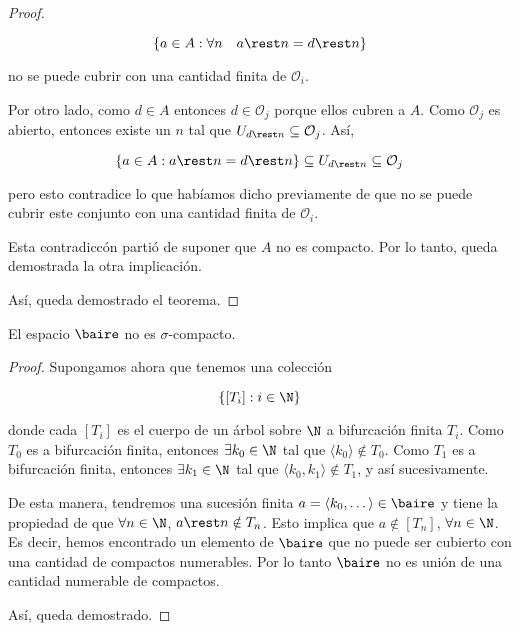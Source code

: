 \begin{proof}
\begin{itemize}
        \[
        \{ a \in A : \forall n \quad a \rest n = d \rest n \}
        \]
        
        \noindent no se puede cubrir con una cantidad finita de $\mathcal{O}_i$.
        
        Por otro lado, como $d \in A$ entonces $d \in \mathcal{O}_j$ porque ellos cubren a $A$. Como $\mathcal{O}_j$ es abierto, entonces existe un $n$ tal que $U_{d \rest n} \subseteq \mathcal{O}_j$. Así,
        
        \[
        \{a \in A : a \rest n = d \rest n\} \subseteq U_{d \rest n} \subseteq \mathcal{O}_j
        \]
        
        \noindent pero esto contradice lo que habíamos dicho previamente de que no se puede cubrir este conjunto con una cantidad finita de $\mathcal{O}_i$.
        
        Esta contradiccón partió de suponer que $A$ no es compacto. Por lo tanto, queda demostrada la otra implicación.
    \end{itemize}
    
    Así, queda demostrado el teorema.
\end{proof}

\begin{teo}
    El espacio $\baire$ no es $\sigma$-compacto.
\end{teo}

\begin{proof}
    Supongamos ahora que tenemos una colección

    \[
    \left\{ [T_i] : i \in \N \right\}
    \]
    
    \noindent donde cada $[T_i]$ es el cuerpo de un árbol sobre $\N$ a bifurcación finita $T_i$. Como $T_0$ es a bifurcación finita, entonces $\exists k_0 \in \N$ tal que $\langle k_0 \rangle \notin T_0$. Como $T_1$ es a bifurcación finita, entonces $\exists k_1 \in \N$ tal que $\langle k_0, k_1 \rangle \notin T_1$, y así sucesivamente.
    
    De esta manera, tendremos una sucesión finita $a = \langle k_0, \dots \rangle \in \baire$ y tiene la propiedad de que $\forall n \in \N$, $a \rest n \notin T_n$. Esto implica que $a \notin [T_n]$, $\forall n \in \N$. Es decir, hemos encontrado un elemento de $\baire$ que no puede ser cubierto con una cantidad de compactos numerables. Por lo tanto $\baire$ no es unión de una cantidad numerable de compactos.
    
    Así, queda demostrado.
\end{proof}